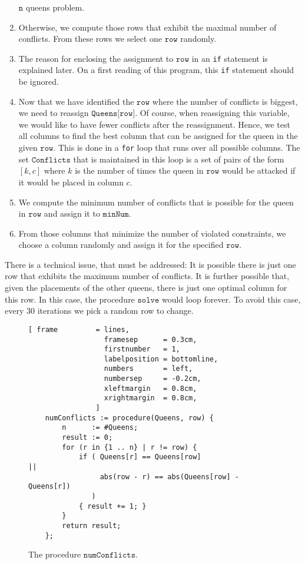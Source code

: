\begin{enumerate}
      $\texttt{n}$ queens problem.
\item Otherwise, we compute those rows that exhibit the maximal number of conflicts.  From these rows
      we select one $\texttt{row}$ randomly.
\item The reason for enclosing the assignment to $\texttt{row}$ in an \texttt{if} statement is explained later. 
      On a first reading of  this program,  this \texttt{if} statement should be ignored.
\item Now that we have identified the $\texttt{row}$ where the number of conflicts is biggest, we need to
      reassign $\texttt{Queens[row]}$.  Of course, when reassigning this variable, we would like to have fewer
      conflicts after the reassignment.  Hence, we test all columns to find the best column that can be
      assigned for the queen in the given $\texttt{row}$.  This is done in a \texttt{for} loop that runs over
      all possible columns.  The set $\texttt{Conflicts}$ that is maintained in this loop is a set of pairs
      of the form $[k, c]$ where $k$ is the number of times the queen in $\texttt{row}$ would be attacked if it
      would be placed in column $c$.
\item We compute the minimum number of conflicts that is possible for the queen in $\texttt{row}$ and assign it
      to $\texttt{minNum}$.
\item From those columns that minimize the number of violated constraints, we choose a column randomly
      and assign it for the specified $\texttt{row}$.
\end{enumerate}
There is a technical issue, that must be addressed:  It is possible there is just one row that exhibits the
maximum number of conflicts.  It is further possible that, given the placements of the other queens, there is
just one optimal column for this row.  In this case, the procedure $\texttt{solve}$ would loop forever.  To
avoid this case, every 30 iterations we pick a random row to change.

\begin{figure}[!ht]
\centering
\begin{Verbatim}[ frame         = lines, 
                  framesep      = 0.3cm, 
                  firstnumber   = 1,
                  labelposition = bottomline,
                  numbers       = left,
                  numbersep     = -0.2cm,
                  xleftmargin   = 0.8cm,
                  xrightmargin  = 0.8cm,
                ]
    numConflicts := procedure(Queens, row) {
        n      := #Queens;
        result := 0;
        for (r in {1 .. n} | r != row) {
            if ( Queens[r] == Queens[row]                     ||
                 abs(row - r) == abs(Queens[row] - Queens[r])
               )
            { result += 1; }
        }
        return result;
    };
\end{Verbatim}
\vspace*{-0.3cm}
\caption{The procedure $\texttt{numConflicts}$.}
\label{fig:numConficts.stlx}
\end{figure}

